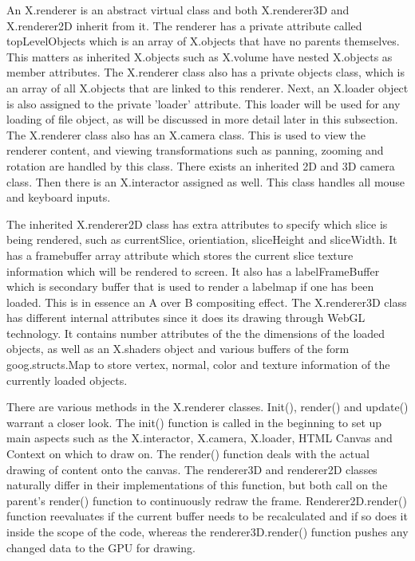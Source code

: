 \documentclass[a4paper,11pt,twoside]{article}
\begin{document}
An X.renderer is an abstract virtual class and both X.renderer3D and X.renderer2D inherit from it. The renderer has a private attribute called topLevelObjects which is an array of X.objects that have no parents themselves. This matters as inherited X.objects such as X.volume have nested X.objects as member attributes. The X.renderer class also has a private objects class, which is an array of all X.objects that are linked to this renderer. Next, an X.loader object is also assigned to the private 'loader' attribute. This loader will be used for any loading of file object, as will be discussed in more detail later in this subsection. The X.renderer class also has an X.camera class. This is used to view the renderer content, and viewing transformations such as panning, zooming and rotation are handled by this class. There exists an inherited 2D and 3D camera class. Then there is an X.interactor assigned as well. This class handles all mouse and keyboard inputs. 

The inherited X.renderer2D class has extra attributes to specify which slice is being rendered, such as currentSlice, orientiation, sliceHeight and sliceWidth. It has a framebuffer array attribute which stores the current slice texture information which will be rendered to screen. It also has a labelFrameBuffer which is secondary buffer that is used to render a labelmap if one has been loaded. This is in essence an A over B compositing effect. The X.renderer3D class has different internal attributes since it does its drawing through WebGL technology. It contains number attributes of the the dimensions of the loaded objects, as well as an X.shaders object and various buffers of the form goog.structs.Map to store vertex, normal, color and texture information of the currently loaded objects.

There are various methods in the X.renderer classes. Init(), render() and update() warrant a closer look. The init() function is called in the beginning to set up main aspects such as the X.interactor, X.camera, X.loader, HTML Canvas and Context on which to draw on. The render() function deals with the actual drawing of content onto the canvas. The renderer3D and renderer2D classes naturally differ in their implementations of this function, but both call on the parent's render() function to continuously redraw the frame. Renderer2D.render() function reevaluates if the current buffer needs to be recalculated and if so does it inside the scope of the code, whereas the renderer3D.render() function pushes any changed data to the GPU for drawing. 
\end{document}
